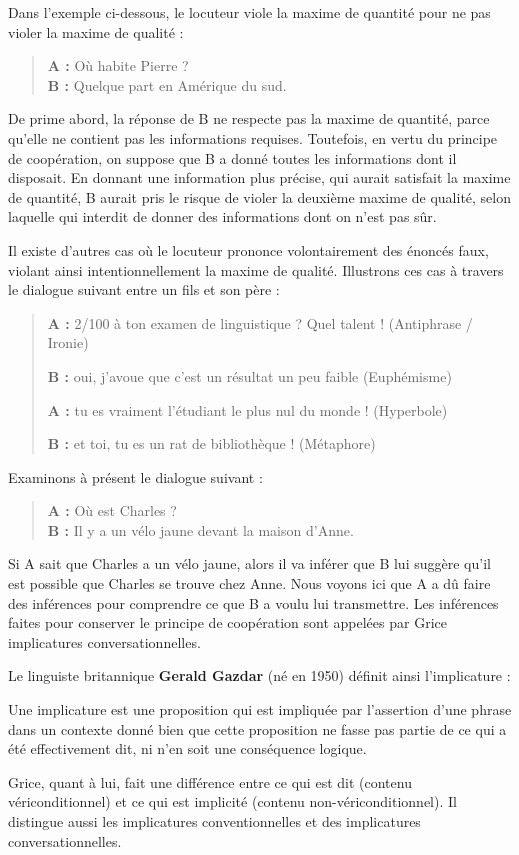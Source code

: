 Dans l’exemple ci-dessous, le locuteur viole la maxime de quantité pour ne pas violer la maxime de qualité :
\begin{quote}
\textbf{A :} Où habite Pierre ?\\
\textbf{B :} Quelque part en Amérique du sud.
\end{quote}
De prime abord, la réponse de B ne respecte pas la maxime de quantité, parce qu’elle ne contient pas les informations requises. Toutefois, en vertu du principe de coopération, on suppose que B a donné toutes les informations dont il disposait. En donnant une information plus précise, qui aurait satisfait la maxime de quantité, B aurait pris le risque de violer la deuxième maxime de qualité, selon laquelle qui interdit de donner des informations dont on n’est pas sûr.

Il existe d’autres cas où le locuteur prononce volontairement des énoncés faux, violant ainsi intentionnellement la maxime de qualité. Illustrons ces cas à travers le dialogue suivant entre un fils et son père :
\begin{quote}
\textbf{A :} 2/100 à ton examen de linguistique ? Quel talent ! \hfill (Antiphrase / Ironie)

\textbf{B :} oui, j’avoue que c’est un résultat un peu faible \hfill (Euphémisme)

\textbf{A :} tu es vraiment l’étudiant le plus nul du monde ! \hfill (Hyperbole)

\textbf{B :} et toi, tu es un rat de bibliothèque ! \hfill (Métaphore)
\end{quote}
Examinons à présent le dialogue suivant :
\begin{quote}
\textbf{A :} Où est Charles ?\\
\textbf{B :} Il y a un vélo jaune devant la maison d’Anne.
\end{quote}
Si A sait que Charles a un vélo jaune, alors il va inférer que B lui suggère qu’il est possible que Charles se trouve chez Anne. Nous voyons ici que A a dû faire des inférences pour comprendre ce que B a voulu lui transmettre. Les inférences faites pour conserver le principe de coopération sont appelées par Grice implicatures conversationnelles.

Le linguiste britannique \textbf{Gerald Gazdar} (né en 1950) définit ainsi l’implicature :
\begin{lecture}{}
Une implicature est une proposition qui est impliquée par l’assertion d’une phrase dans un contexte donné bien que cette proposition ne fasse pas partie de ce qui a été effectivement dit, ni n’en soit une conséquence logique.
\end{lecture}
Grice, quant à lui, fait une différence entre ce qui est dit (contenu vériconditionnel) et ce qui est implicité (contenu non-vériconditionnel). Il distingue aussi les implicatures conventionnelles et des implicatures conversationnelles.

